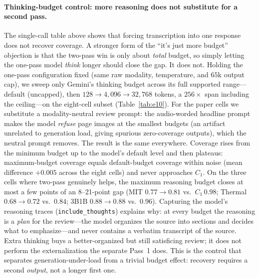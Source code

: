 \documentclass[11pt]{article}
\begin{document}
\paragraph{Thinking-budget control: more reasoning does not substitute for a second pass.}
The single-call table above shows that forcing transcription into one response does not recover coverage. A stronger form of the ``it's just more budget'' objection is that the two-pass win is only about \emph{total} budget, so simply letting the one-pass model \emph{think} longer should close the gap. It does not. Holding the one-pass configuration fixed (same raw modality, temperature, and $65$k output cap), we sweep only Gemini's thinking budget across its full supported range---default (uncapped), then $128 \to 4{,}096 \to 32{,}768$ tokens, a $256\times$ span including the ceiling---on the eight-cell subset (Table~\ref{tab:e10}). For the paper cells we substitute a modality-neutral review prompt: the audio-worded headline prompt makes the model \emph{refuse} page images at the smallest budgets (an artifact unrelated to generation load, giving spurious zero-coverage outputs), which the neutral prompt removes. The result is the same everywhere. Coverage rises from the minimum budget up to the model's default level and then plateaus: maximum-budget coverage equals default-budget coverage within noise (mean difference $+0.005$ across the eight cells) and never approaches $C_1$. On the three cells where two-pass genuinely helps, the maximum reasoning budget closes at most a few points of an 8--21-point gap (MIT $0.77\!\to\!0.81$ vs.\ $C_1\,0.98$; Thermal $0.68\!\to\!0.72$ vs.\ $0.84$; 3B1B $0.88\!\to\!0.88$ vs.\ $0.96$). Capturing the model's reasoning traces (\texttt{include\_thoughts}) explains why: at every budget the reasoning is a \emph{plan} for the review---the model organizes the source into sections and decides what to emphasize---and never contains a verbatim transcript of the source. Extra thinking buys a better-organized but still satisficing review; it does not perform the externalization the separate Pass~1 does. This is the control that separates generation-under-load from a trivial budget effect: recovery requires a second \emph{output}, not a longer first one.
\end{document}
